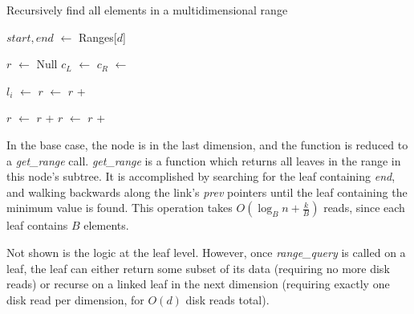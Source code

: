 \documentclass[11pt, oneside]{article}
\newcommand*\Let[2]{\State #1 $\gets$ #2}
\newcommand{\ms}{\textit}
\begin{document}
\begin{algorithm}
    \caption{Recursively find all elements in a multidimensional range}
    \begin{algorithmic}[1]
        \Statex
            \Let{$start, end$}{Ranges[$d$]}
                \State \Return{}
            \EndIf
            
            \State
            \Let{$r$}{Null}
            \Let{$c_L$}{}
            \Let{$c_R$}{}
            \State {}
            \State

                \State {}
                \Let{$l_i$}{}
                \Let{$r$}{$r$ + }
            \EndFor

            \State
            \State {}
            
            \Let{$r$}{$r$ + }
            \Let{$r$}{$r$ + }

            \State {}
        \EndFunction
    \end{algorithmic}
\end{algorithm}

In the base case, the node is in the last dimension, and the function is reduced
to a \ms{get\_range} call. \ms{get\_range} is a function which returns all
leaves in the range in this node's subtree. It is accomplished by searching for
the leaf containing \ms{end}, and walking backwards along the link's \ms{prev}
pointers until the leaf containing the minimum value is found. This operation
takes $O(\log_B n + \frac{k}{B})$ reads, since each leaf contains $B$ elements.

Not shown is the logic at the leaf level. However, once \ms{range\_query} is
called on a leaf, the leaf can either return some subset of its data (requiring
no more disk reads) or recurse on a linked leaf in the next dimension (requiring
exactly one disk read per dimension, for $O(d)$ disk reads total).
\end{document}

